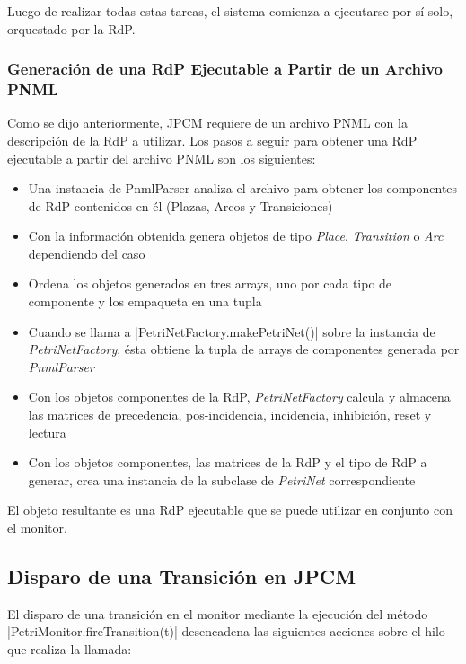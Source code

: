 Luego de realizar todas estas tareas, el sistema comienza a ejecutarse por sí
solo, orquestado por la RdP.

\subsubsection{Generación de una RdP Ejecutable a Partir de un Archivo PNML}
Como se dijo anteriormente, JPCM requiere de un archivo PNML con la descripción
de la RdP a utilizar. Los pasos a seguir para obtener una RdP ejecutable a
partir del archivo PNML son los siguientes:
\begin{itemize}
  \item Una instancia de PnmlParser analiza el archivo para obtener los
  componentes de RdP contenidos en él (Plazas, Arcos y Transiciones)
  \item Con la información obtenida genera objetos de tipo \textit{Place},
  \textit{Transition} o \textit{Arc} dependiendo del caso
  \item Ordena los objetos generados en tres arrays, uno por cada tipo de
  componente y los empaqueta en una tupla
  \item Cuando se llama a |PetriNetFactory.makePetriNet()| sobre la
  instancia de \textit{PetriNetFactory}, ésta obtiene la tupla de arrays de
  componentes generada por \textit{PnmlParser}
  \item Con los objetos componentes de la RdP, \textit{PetriNetFactory} calcula
  y almacena las matrices de precedencia, pos-incidencia, incidencia, inhibición,
  reset y lectura
  \item Con los objetos componentes, las matrices de la RdP y el tipo de RdP a
  generar, crea una instancia de la subclase de \textit{PetriNet}
  correspondiente
\end{itemize}

El objeto resultante es una RdP ejecutable que se puede utilizar en conjunto
con el monitor.

\subsection{Disparo de una Transición en JPCM}
El disparo de una transición en el monitor mediante la ejecución del método
|PetriMonitor.fireTransition(t)| desencadena las siguientes acciones
sobre el hilo que realiza la llamada:

